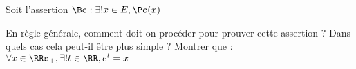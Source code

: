%
%
	Soit l'assertion $\Bc : \exists ! x \in E, \Pc(x)$
	\begin{tasks}
		\task En règle générale, comment doit-on procéder pour prouver cette assertion ?
		\task Dans quels cas cela peut-il être plus simple ?
		\task Montrer que : $\forall x \in \RRs_+, \exists ! t \in  \RR, e^t = x$
	\end{tasks}
